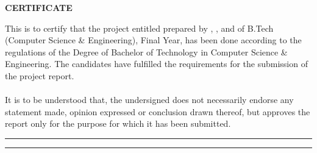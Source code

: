 \vspace*{\fill} %



\begin{center}
 \LARGE {\bf \uppercase{Certificate}}
\end{center}

\vspace{1\baselineskip}


\noindent
This is to certify that the project entitled  prepared by ,  ,  and  of B.Tech (Computer Science \& Engineering), Final Year, has been done according to the regulations of the Degree of
Bachelor of Technology in Computer Science \& Engineering. The candidates have
fulfilled the requirements for the submission of the project report.\\\\
It is to be understood that, the undersigned does not necessarily endorse any statement made, opinion expressed or conclusion drawn thereof, but approves the report only for the purpose for which it has been submitted.

\hspace{\baselineskip}

\vspace{3\baselineskip}
\begin{flushleft}
\begin{minipage}[c]{0.45\textwidth}
\centering
\hrule 
\vspace{0.5\baselineskip}
\end{minipage}
\hspace{1.0\baselineskip}
\end{flushleft}

\vspace{-1.15cm}

\begin{flushright}
\begin{minipage}[c]{0.45\textwidth}
\centering
\hrule 
\vspace{0.5\baselineskip}
\end{minipage}
\end{flushright}
\vspace{\baselineskip}
\hspace{1.0\baselineskip}

